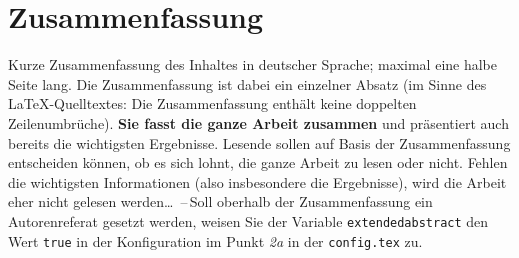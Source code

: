 \section*{Zusammenfassung}
%
%
%

Kurze Zusammenfassung des Inhaltes in deutscher Sprache; maximal eine halbe Seite lang. Die Zusammenfassung ist dabei ein einzelner Absatz (im Sinne des \LaTeX-Quelltextes: Die Zusammenfassung enthält keine doppelten Zeilenumbrüche). \textbf{Sie fasst die ganze Arbeit zusammen} und präsentiert auch bereits die wichtigsten Ergebnisse. Lesende sollen auf Basis der Zusammenfassung entscheiden können, ob es sich lohnt, die ganze Arbeit zu lesen oder nicht. Fehlen die wichtigsten Informationen (also insbesondere die Ergebnisse), wird die Arbeit eher nicht gelesen werden\dots\ \mbox{--\,Soll} oberhalb der Zusammenfassung ein Autorenreferat gesetzt werden, weisen Sie der Variable \texttt{extendedabstract} den Wert \texttt{true} in der Konfiguration im Punkt \emph{2a} in der \texttt{config.tex} zu.

%
